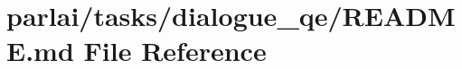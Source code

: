 \hypertarget{parlai_2tasks_2dialogue__qe_2README_8md}{}\section{parlai/tasks/dialogue\+\_\+qe/\+R\+E\+A\+D\+ME.md File Reference}
\label{parlai_2tasks_2dialogue__qe_2README_8md}
